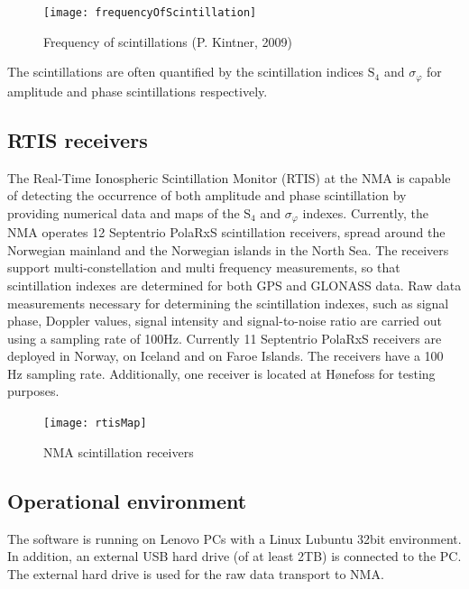 \documentclass{themeensg}
\begin{document}
\begin{figure}[ht]
	\centering
	\texttt{[image: frequencyOfScintillation]}
	\caption{Frequency of scintillations (P. Kintner, 2009)}
\end{figure}

The scintillations are often quantified by the scintillation indices $\text{S}_{\text{4}}$ and $\sigma_\varphi$ for amplitude and phase scintillations respectively.

\subsection{RTIS receivers} 
The Real-Time Ionospheric Scintillation Monitor (RTIS) at the NMA is capable of detecting the occurrence of both amplitude and phase scintillation by providing numerical data and maps of the $\text{S}_{\text{4}}$ and $\sigma_\varphi$ indexes. Currently, the NMA operates 12 Septentrio PolaRxS scintillation receivers, spread around the Norwegian mainland and the Norwegian islands in the North Sea. The receivers support multi-constellation and multi frequency measurements, so that scintillation indexes are determined for both GPS and GLONASS data. Raw data measurements necessary for determining the scintillation indexes, such as signal phase, Doppler values, signal intensity and signal-to-noise ratio are carried out using a sampling rate of 100Hz.
Currently 11 Septentrio PolaRxS receivers are deployed in Norway, on Iceland and on Faroe Islands. The receivers have a 100 Hz sampling rate. Additionally, one receiver is located at Hønefoss for testing purposes. \\

\begin{figure}[h]
	\centering
	\texttt{[image: rtisMap]}
	\caption{NMA scintillation receivers}
\end{figure}

\subsection{Operational environment}
The software is running on Lenovo PCs with a Linux Lubuntu 32bit environment. In addition, an external USB hard drive (of at least 2TB) is connected to the PC. The external hard drive is used for the raw data transport to NMA.\\
\end{document}
